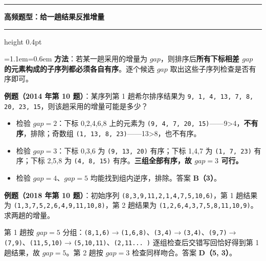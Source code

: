 \documentclass[11pt,openany,UTF8]{ctexbook}
\newcommand{\callouthead}[2]{%
  \par\addvspace{7pt}\noindent
  {\color{#1}\rule[-0.15em]{3pt}{1.05em}}\hspace{0.5em}%
  {\bfseries\color{#1}#2}\par\nobreak\vspace{-0.35em}%
  {\color{rulesep}\hrule height 0.4pt}\nobreak\vspace{0.45em}%
  \begingroup\small\setlength{\parindent}{0pt}%
  \leftskip=1.1em\rightskip=0.6em\noindent\ignorespaces}
\newcommand{\calloutend}{\par\endgroup\addvspace{7pt}}
\newenvironment{callexam}[1]{\callouthead{exambar}{#1}}{\calloutend}
\begin{document}
\begin{callexam}{高频题型：给一趟结果反推增量}
\textbf{方法}：若某一趟采用的增量为 $gap$，则排序后\textbf{所有下标相差 $gap$ 的元素构成的子序列都必须各自有序}。逐个候选 $gap$ 取出这些子序列检查是否有序即可。

\textbf{例题（2014 年第 10 题）}：某序列第 1 趟希尔排序结果为 \texttt{9,\allowbreak{} 1,\allowbreak{} 4,\allowbreak{} 13,\allowbreak{} 7,\allowbreak{} 8,\allowbreak{} 20,\allowbreak{} 23,\allowbreak{} 15}，则该趟采用的增量可能是多少？

\begin{itemize}
\item 检验 $gap=2$：下标 0,2,4,6,8 上的元素为 \texttt{(9,\allowbreak{} 4,\allowbreak{} 7,\allowbreak{} 20,\allowbreak{} 15)\allowbreak{}}——9>4，\textbf{不有序}，排除；奇数组 \texttt{(1,\allowbreak{} 13,\allowbreak{} 8,\allowbreak{} 23)\allowbreak{}}——13>8，也不有序。
\item 检验 $gap=3$：下标 0,3,6 为 \texttt{(9,\allowbreak{} 13,\allowbreak{} 20)\allowbreak{}} 有序；下标 1,4,7 为 \texttt{(1,\allowbreak{} 7,\allowbreak{} 23)\allowbreak{}} 有序；下标 2,5,8 为 \texttt{(4,\allowbreak{} 8,\allowbreak{} 15)\allowbreak{}} 有序。\textbf{三组全部有序，故 $gap=3$ 可行。}
\item 检验 $gap=4$、$gap=5$ 均能找到组内逆序，排除。答案 \textbf{B（3）}。
\end{itemize}
\textbf{例题（2018 年第 10 题）}：初始序列 \texttt{(8,\allowbreak{}3,\allowbreak{}9,\allowbreak{}11,\allowbreak{}2,\allowbreak{}1,\allowbreak{}4,\allowbreak{}7,\allowbreak{}5,\allowbreak{}10,\allowbreak{}6)\allowbreak{}}，第 1 趟结果为 \texttt{(1,\allowbreak{}3,\allowbreak{}7,\allowbreak{}5,\allowbreak{}2,\allowbreak{}6,\allowbreak{}4,\allowbreak{}9,\allowbreak{}11,\allowbreak{}10,\allowbreak{}8)\allowbreak{}}，第 2 趟结果为 \texttt{(1,\allowbreak{}2,\allowbreak{}6,\allowbreak{}4,\allowbreak{}3,\allowbreak{}7,\allowbreak{}5,\allowbreak{}8,\allowbreak{}11,\allowbreak{}10,\allowbreak{}9)\allowbreak{}}。求两趟的增量。

第 1 趟按 $gap=5$ 分组：\texttt{(8,\allowbreak{}1,\allowbreak{}6)\allowbreak{}}$\to$\texttt{(1,\allowbreak{}6,\allowbreak{}8)\allowbreak{}}、\texttt{(3,\allowbreak{}4)\allowbreak{}}$\to$\texttt{(3,\allowbreak{}4)\allowbreak{}}、\texttt{(9,\allowbreak{}7)\allowbreak{}}$\to$\texttt{(7,\allowbreak{}9)\allowbreak{}}、\texttt{(11,\allowbreak{}5,\allowbreak{}10)\allowbreak{}}$\to$\texttt{(5,\allowbreak{}10,\allowbreak{}11)\allowbreak{}}、\texttt{(2,\allowbreak{}11... )\allowbreak{}} 逐组检查后交错写回恰好得到第 1 趟结果，故 $gap=5$。第 2 趟按 $gap=3$ 检查同样吻合。答案 \textbf{D（5, 3）}。

\end{callexam}
\end{document}
